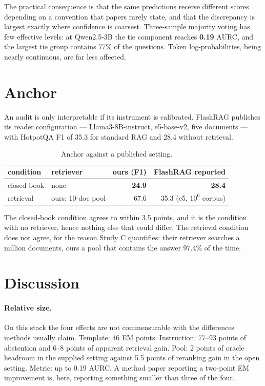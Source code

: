 ﻿\documentclass[11pt]{article}
\begin{document}
The practical consequence is that the same predictions receive different scores depending on a
convention that papers rarely state, and that the discrepancy is largest exactly where
confidence is coarsest. Three-sample majority voting has few effective levels: at Qwen2.5-3B the
tie component reaches \textbf{0.19} AURC, and the largest tie group contains 77\% of the
questions. Token log-probabilities, being nearly continuous, are far less affected.

\section{Anchor}
\label{sec:anchor}

An audit is only interpretable if its instrument is calibrated. FlashRAG publishes its reader
configuration --- Llama3-8B-instruct, e5-base-v2, five documents --- with HotpotQA F1 of 35.3 for
standard RAG and 28.4 without retrieval.

\begin{table}[t]
\centering
\caption{Anchor against a published setting.}
\label{tab:anchor}
\begin{tabular}{@{}llrr@{}}
\toprule
condition & retriever & ours (F1) & FlashRAG reported \\
\midrule
closed book & none & \textbf{24.9} & \textbf{28.4} \\
retrieval & ours: 10-doc pool & 67.6 & 35.3 (e5, $10^6$ corpus) \\
\bottomrule
\end{tabular}
\end{table}

The closed-book condition agrees to within 3.5 points, and it is the condition with no
retriever, hence nothing else that could differ. The retrieval condition does not agree, for the
reason Study C quantifies: their retriever searches a million documents, ours a pool that
contains the answer 97.4\% of the time.

\section{Discussion}

\paragraph{Relative size.} On this stack the four effects are not commensurable with the
differences methods usually claim. Template: 46 EM points. Instruction: 77--93 points of
abstention and 6--8 points of apparent retrieval gain. Pool: 2 points of oracle headroom in the
supplied setting against 5.5 points of reranking gain in the open setting. Metric: up to 0.19
AURC. A method paper reporting a two-point EM improvement is, here, reporting something smaller
than three of the four.
\end{document}
